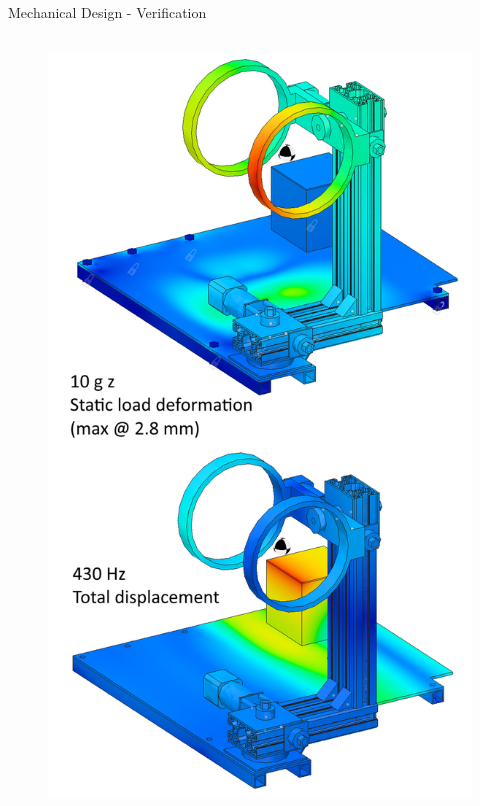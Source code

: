 \documentclass[11pt, aspectratio=169]{beamer}
\begin{document}
\begin{frame}[c]{Mechanical Design - Verification}
\begin{columns}[t]
            \begin{column}{.5\textwidth}
                \begin{figure}
                     \includegraphics[height=0.9\textheight]{mechanical/verification.png}
                \end{figure}
            \end{column}
        \end{columns}
\end{frame}
\end{document}
